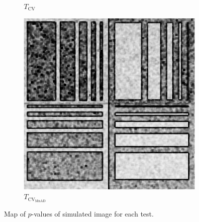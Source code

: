 \documentclass[aspectratio=1610,10pt]{beamer}
\begin{document}
\begin{frame}
\begin{figure}[H]
\begin{subfigure}[b]{0.3\textwidth}
    \caption{$T_\text{CV}$}
    \label{fig:sim_SAR_Images-2}
  \end{subfigure}
  \hfill
  \begin{subfigure}[b]{0.3\textwidth}
    \centering
    \includegraphics[width=\textwidth]{../../Figures/PNG/mnad_p_values_Phantom_mnad_7_z1}
     \caption{$T_{\text{CV}_{\text{MnAD}}}$}
    \label{fig:sim_SAR_Images-3}
  \end{subfigure}
  \caption{Map of $p$-values of simulated image for each test. }
  \label{fig:sim_SAR_Images}
\end{figure}
 
\end{frame} 
\end{document}
